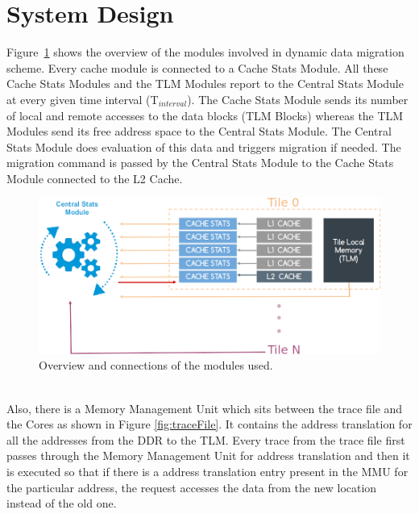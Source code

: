 \documentclass{listhesis}
\begin{document}
\section{System Design}
Figure~\ref{fig:overviewOfSolution} shows the overview of the modules involved in dynamic data migration scheme. Every cache module is connected to a Cache Stats Module. All these Cache Stats Modules and the TLM Modules report to the Central Stats Module at every given time interval (T$_{interval}$). The Cache Stats Module sends its number of local and remote accesses to the data blocks (TLM Blocks) whereas the TLM Modules send its free address space to the Central Stats Module. The Central Stats Module does evaluation of this data and triggers migration if needed. The migration command is passed by the Central Stats Module to the Cache Stats Module connected to the L2 Cache.\\
\begin{figure}
  \includegraphics[width=\linewidth]{moduleconnections.png}
  \centering
  \caption{Overview and connections of the modules used.}
  \label{fig:overviewOfSolution}
\end{figure}
\\
Also, there is a Memory Management Unit which sits between the trace file and the Cores as shown in Figure \ref{fig:traceFile}. It contains the address translation for all the addresses from the DDR to the TLM. Every trace from the trace file first passes through the Memory Management Unit for address translation and then it is executed so that if there is a address translation entry present in the MMU for the particular address, the request accesses the data from the new location instead of the old one.\\ 
\end{document}
